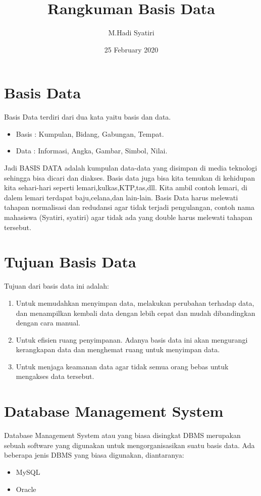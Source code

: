 \documentclass{article}
\title{Rangkuman Basis Data}
\author{M.Hadi Syatiri}
\date{25 February 2020}
\begin{document}
\maketitle

\section{Basis Data}
\maketitle
Basis Data terdiri dari dua kata yaitu basis dan data.
\begin{itemize}
    \item Basis : Kumpulan, Bidang, Gabungan, Tempat.
    \item Data : Informasi, Angka, Gambar, Simbol, Nilai.
\end{itemize}
Jadi BASIS DATA adalah kumpulan data-data yang disimpan di media teknologi sehingga bisa dicari dan diakses. Basis data juga bisa kita temukan di kehidupan kita sehari-hari seperti lemari,kulkas,KTP,tas,dll. Kita ambil contoh lemari, di dalem lemari terdapat baju,celana,dan lain-lain. Basis Data harus melewati tahapan normalisasi dan redudansi agar tidak terjadi pengulangan, contoh nama mahasiswa (Syatiri, syatiri) agar tidak ada yang double harus melewati tahapan tersebut.

\section{Tujuan Basis Data}
\maketitle
Tujuan dari basis data ini adalah:
\begin{enumerate}
\item
Untuk memudahkan menyimpan data, melakukan perubahan terhadap data, dan menampilkan kembali data dengan lebih cepat dan mudah dibandingkan dengan cara manual.
\item
Untuk efisien ruang penyimpanan. Adanya basis data ini akan mengurangi kerangkapan data dan menghemat ruang untuk menyimpan data.
\item
Untuk menjaga keamanan data agar tidak semua orang bebas untuk mengakses data tersebut.
\end{enumerate}

\section{Database Management System}
\maketitle
Database Management System atau yang biasa disingkat DBMS merupakan sebuah software yang digunakan untuk mengorganisasikan suatu basis data. Ada beberapa jenis DBMS yang biasa digunakan, diantaranya:
\begin{itemize}
    \item MySQL
    \item Oracle
\end{itemize}
\end{document}
